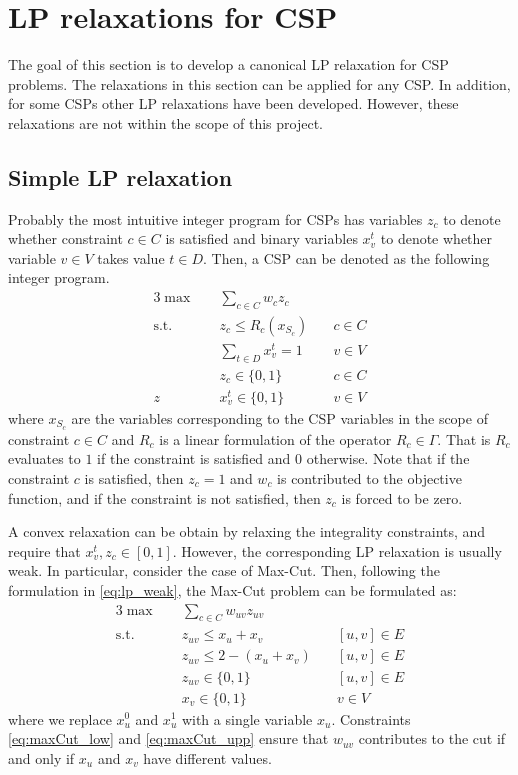 \section{LP relaxations for CSP}
The goal of this section is to develop a canonical LP relaxation for CSP problems. The relaxations in this section can be applied for any CSP. 
In addition, for some CSPs other LP relaxations have been developed. However, these relaxations are not within the scope of this project.

\subsection{Simple LP relaxation}
Probably the most intuitive integer program for CSPs has variables $z_c$ to denote whether constraint $c \in C$ is satisfied and binary variables $x_v^t$ to denote whether variable $v \in V$ takes value $t \in D$. 
Then, a CSP can be denoted as the following integer program.
\begin{alignat}{3}
	\max \quad & \sum_{c \in C}w_c z_c & \label{eq:lp_weak}\\
	\text{s.t.} \quad & z_c \le R_c( x_{S_c} ) & \quad c \in C \nonumber \\
	& \sum_{t \in D} x_v^t = 1 & \quad v \in V \nonumber\\
	& z_c \in \{0,1\} & \quad c \in C \nonumber\\z
	&	x_v^t \in \{0,1\}	& \quad v \in  V \nonumber
\end{alignat}
where $x_{S_c}$ are the variables corresponding to the CSP variables in the scope of constraint $c \in C$ and $R_c$ is a linear formulation of the operator $R_c \in \Gamma$. 
That is $R_c$ evaluates to $1$ if the constraint is satisfied and $0$ otherwise. 
Note that if the constraint $c$ is satisfied, then $z_c = 1$ and $w_c$ is contributed to the objective function, and if the constraint is not satisfied, then $z_c$ is forced to be zero. 

A convex relaxation can be obtain by relaxing the integrality constraints, and require that $x_v^t, z_c \in [ 0,1]$. 
However, the corresponding LP relaxation is usually weak. In particular, consider the case of Max-Cut. 
Then, following the formulation in \eqref{eq:lp_weak}, the Max-Cut problem can be formulated as:
\begin{alignat}{3}
\max \quad & \sum_{c \in C}w_{uv} z_{uv} & \label{eq:maxCut_weak}\\
\text{s.t.} \quad & z_{uv} \le x_u + x_v & \quad [u,v] \in E \label{eq:maxCut_low} \\
& z_{uv} \le 2 - ( x_u + x_v ) & \quad [u,v] \in E \label{eq:maxCut_upp}\\
& z_{uv} \in \{0,1\} & \quad [u,v] \in E \nonumber\\
&	x_v \in \{0,1\}	& \quad v \in  V \nonumber
\end{alignat}
where we replace $x_{u}^0$ and $x_u^1$ with a single variable $x_u$. 
Constraints \eqref{eq:maxCut_low} and \eqref{eq:maxCut_upp} ensure that $w_{uv}$ contributes to the cut if and only if $x_u$ and $x_v$ have different values.

